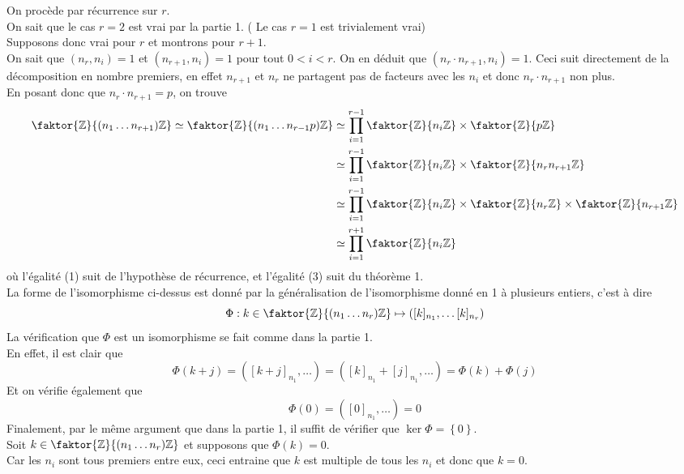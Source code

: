 \documentclass[11pt, a4paper, twoside]{article}
\newcommand{\f}{\faktor}
\begin{document}
On procède par récurrence sur $r$.\\
On sait que le cas $r=2$ est vrai par la partie 1. ( Le cas $r=1$ est trivialement vrai)\\
Supposons donc vrai pour $r$ et montrons pour $r+1$.\\
On sait que $(n_r, n_i) =1$ et $( n_{r+1} , n_i) =1$ pour tout $0<i<r$. On en déduit que $( n_r \cdot n_{r+1} , n_i) =1$. Ceci suit directement de la décomposition en nombre premiers, en effet $n_{r+1} $ et $n_r$ ne partagent pas de facteurs avec les $n_i$ et donc $n_r \cdot n_{r+1} $ non plus.\\
En posant donc que $n_r\cdot n_{r+1}= p $, on trouve
\begin{align}
	\f { \mathbb{Z}} { ( n_1\ldots n_{r+1})\mathbb{Z}} \simeq \f { \mathbb{Z}} { ( n_1\ldots n_{r-1} p) \mathbb{Z}} &\simeq \prod_{i=1}^{r-1}\f { \mathbb{Z}} { n_i \mathbb{Z} }  \times \f { \mathbb{Z}} { p \mathbb{Z}} \\
							      &\simeq \prod_{i=1}^{r-1} \f { \mathbb{Z}} { n_i \mathbb{Z} }\times \f { \mathbb{Z}} { n_r n_{r+1} \mathbb{Z}} \\
							      &\simeq \prod_{i=1}^{r-1}\f { \mathbb{Z}} { n_i \mathbb{Z} }  \times \f { \mathbb{Z}} { n_r \mathbb{Z}} \times \f { \mathbb{Z}} { n_{r+1} \mathbb{Z}} \\
							      &\simeq \prod_{i=1}^{r+1}\f { \mathbb{Z}} { n_i \mathbb{Z}} 
\end{align}
où l'égalité (1) suit de l'hypothèse de récurrence, et l'égalité (3) suit du théorème 1.\\
La forme de l'isomorphisme ci-dessus est donné par la généralisation de l'isomorphisme donné en 1 à plusieurs entiers, c'est à dire
\[ 
	\Phi: k \in \f { \mathbb{Z}} { ( n_1\ldots n_{r}) \mathbb{Z}} \mapsto ( [ k]_{n_1} , \ldots [k]_{n_r} ) 
\]
La vérification que $\Phi$ est un isomorphisme se fait comme dans la partie 1.\\
En effet, il est clair que
\[ 
	\Phi( k+j) = \left( [ k+j]_{n_1}, \ldots \right) = \left( [ k]_{n_1} + [ j]_{n_1} , \ldots \right) = \Phi( k) + \Phi(j) 
\]
Et on vérifie également que
\[ 
	\Phi( 0) = \left( [ 0]_{n_1}, \ldots\right) = 0
\]
Finalement, par le même argument que dans la partie 1, il suffit de vérifier que $\ker \Phi = \left\{ 0 \right\} $. \\
Soit $k \in \f { \mathbb{Z}} { ( n_1\ldots n_{r} ) \mathbb{Z}} $ et supposons que $\Phi( k) = 0$.\\
Car les $n_i$ sont tous premiers entre eux, ceci entraine que $k$ est multiple de tous les $n_i$ et donc que $k=0$.\\
\end{document}
